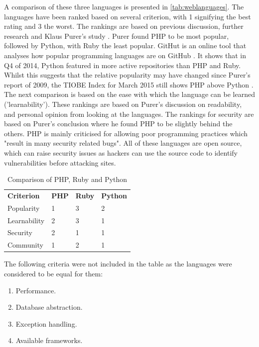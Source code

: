 \documentclass[authoryearcitations]{UoYCSproject}
\begin{document}
A comparison of these three languages is presented in \autoref{tab:weblanguages}. The languages have been ranked based on several criterion, with 1 signifying the best rating and 3 the worst. The rankings are based on previous discussion, further research and Klaus Purer's study \citep{Purer2009}. Purer found PHP to be most popular, followed by Python, with Ruby the least popular. GitHut is an online tool that analyses how popular programming languages are on GitHub \citep{Zapponi2014}. It shows that in Q4 of 2014, Python featured in more active repositories than PHP and Ruby. Whilst this suggests that the relative popularity may have changed since Purer's report of 2009, the TIOBE Index for March 2015 still shows PHP above Python \citep{TIOBESoftware2015}. The next comparison is based on the ease with which the language can be learned ('learnability'). These rankings are based on Purer's discussion on readability, and personal opinion from looking at the languages. The rankings for security are based on Purer's conclusion where he found PHP to be slightly behind the others. PHP is mainly criticised for allowing poor programming practices which "result in many security related bugs". All of these languages are open source, which can raise security issues as hackers can use the source code to identify vulnerabilities before attacking sites. 

\begin{table}[tbp]
   \caption{Comparison of PHP, Ruby and Python}
  \begin{tabular}{ p{4.0cm}  p{3.0cm}  p{3.0cm}  p{3.0cm} }
      \textbf{Criterion} & \textbf{PHP} & \textbf{Ruby} & \textbf{Python}
    \\Popularity & 1 & 3 & 2 
    \\Learnability & 2 & 3 & 1
	\\Security & 2 & 1 & 1 
	\\Community & 1 & 2 & 1 
  \end{tabular}
  \label{tab:weblanguages}
\end{table}

The following criteria were not included in the table as the languages were considered to be equal for them:

\begin{enumerate}
  \item Performance.
  \item Database abstraction.
  \item Exception handling.
  \item Available frameworks.
\end{enumerate}
\end{document}
